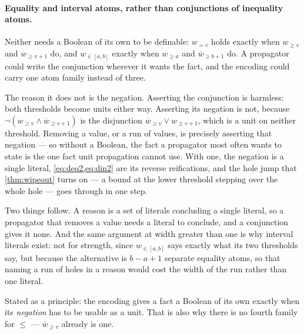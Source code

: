\documentclass[11pt,a4paper]{article}
\theoremstyle{plain}
\theoremstyle{definition}
\theoremstyle{remark}
\newcommand{\atge}[2]{#1_{\geq #2}}
\newcommand{\ateq}[2]{#1_{= #2}}
\newcommand{\atin}[3]{#1_{\in[#2,#3]}}
\newcommand{\natge}[2]{\overline{#1}_{\geq #2}}
\begin{document}
\paragraph{Equality and interval atoms, rather than conjunctions of inequality
atoms.}
Neither needs a Boolean of its own to be definable: $\ateq{w}{v}$ holds exactly
when $\atge{w}{v}$ and $\natge{w}{v+1}$ do, and $\atin{w}{a}{b}$ exactly when
$\atge{w}{a}$ and $\natge{w}{b+1}$ do.  A propagator could write the conjunction
wherever it wants the fact, and the encoding could carry one atom family instead
of three.

The reason it does not is the negation.  Asserting the conjunction is harmless:
both thresholds become units either way.  Asserting its negation is not, because
$\neg(\atge{w}{v}\wedge\natge{w}{v+1})$ is the disjunction
$\natge{w}{v}\vee\atge{w}{v+1}$, which is a unit on neither threshold.  Removing a
value, or a run of values, is precisely asserting that negation --- so without a
Boolean, the fact a propagator most often wants to state is the one fact unit
propagation cannot use.  With one, the negation is a single literal,
\cref{eq:deq2,eq:din2} are its reverse reifications, and the hole jump that
\cref{thm:wipeout} turns on --- a bound at the lower threshold stepping over the whole
hole --- goes through in one step.

Two things follow.  A reason is a set of literals concluding a single literal, so
a propagator that removes a value needs a literal to conclude, and a conjunction
gives it none.  And the same argument at width greater than one is why interval
literals exist: not for strength, since $\atin{w}{a}{b}$ says exactly what its
two thresholds say, but because the alternative is $b-a+1$ separate equality atoms, so
that naming a run of holes in a reason would cost the width of the run rather
than one literal.

Stated as a principle: the encoding gives a fact a Boolean of its own exactly
when its \emph{negation} has to be usable as a unit.  That is also why there is
no fourth family for $\leq$ --- $\natge{w}{v}$ already is one.
\end{document}
